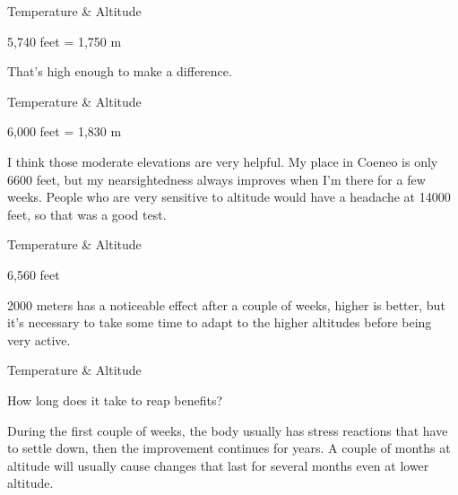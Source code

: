 \documentclass[11pt,oneside,openany,extrafontsizes]{memoir}
\begin{document}
\begin{standalonequote}{Temperature \& Altitude}
    \begin{note}
        5,740 feet = 1,750 m
    \end{note}

    \begin{answer}
        That's high enough to make a difference.
    \end{answer}
\end{standalonequote}

\begin{standalonequote}{Temperature \& Altitude}
    \begin{note}
        6,000 feet = 1,830 m
    \end{note}

    \begin{answer}
        I think those moderate elevations are very helpful. My place in Coeneo is only 6600 feet, but my nearsightedness always improves when I'm there for a few weeks. People who are very sensitive to altitude would have a headache at 14000 feet, so that was a good test.
    \end{answer}
\end{standalonequote}

\begin{standalonequote}{Temperature \& Altitude}
    \begin{note}
        6,560 feet
    \end{note}

    \begin{answer}
        2000 meters has a noticeable effect after a couple of weeks, higher is better, but it's necessary to take some time to adapt to the higher altitudes before being very active.
    \end{answer}
\end{standalonequote}

\begin{qaexchange}{Temperature \& Altitude}

    \begin{question}
        How long does it take to reap benefits?
    \end{question}

    \begin{answer}
        During the first couple of weeks, the body usually has stress reactions that have to settle down, then the improvement continues for years. A couple of months at altitude will usually cause changes that last for several months even at lower altitude.
    \end{answer}
\end{qaexchange}
\end{document}
